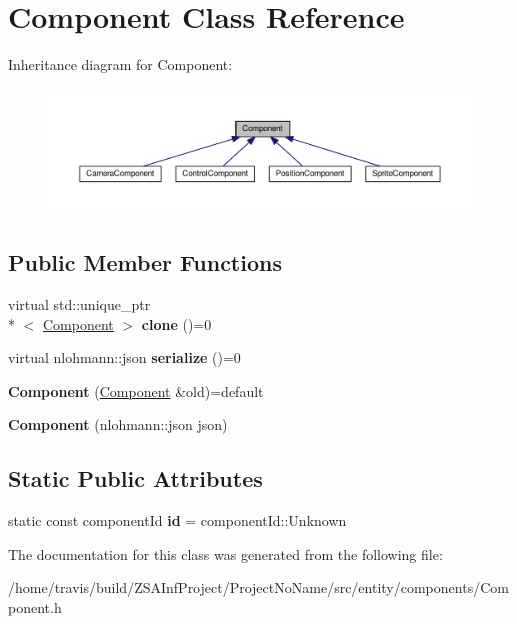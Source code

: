 \hypertarget{classComponent}{\section{Component Class Reference}
\label{classComponent}
}


Inheritance diagram for Component\-:
\nopagebreak
\begin{figure}[H]
\begin{center}
\leavevmode
\includegraphics[width=350pt]{classComponent__inherit__graph}
\end{center}
\end{figure}
\subsection*{Public Member Functions}
\begin{DoxyCompactItemize}
\item 
\hypertarget{classComponent_ab2be3d9a939ca73fa91d466be943fe69}{virtual std\-::unique\-\_\-ptr\\*
$<$ \hyperlink{classComponent}{Component} $>$ {\bfseries clone} ()=0}\label{classComponent_ab2be3d9a939ca73fa91d466be943fe69}

\item 
\hypertarget{classComponent_aff82f03afac28575d466fedd59219c3a}{virtual nlohmann\-::json {\bfseries serialize} ()=0}\label{classComponent_aff82f03afac28575d466fedd59219c3a}

\item 
\hypertarget{classComponent_a61a9c995bc0584eb210cf313107204c1}{{\bfseries Component} (\hyperlink{classComponent}{Component} \&old)=default}\label{classComponent_a61a9c995bc0584eb210cf313107204c1}

\item 
\hypertarget{classComponent_a7597fcf89c237b2cf5f584733c7b20d4}{{\bfseries Component} (nlohmann\-::json json)}\label{classComponent_a7597fcf89c237b2cf5f584733c7b20d4}

\end{DoxyCompactItemize}
\subsection*{Static Public Attributes}
\begin{DoxyCompactItemize}
\item 
\hypertarget{classComponent_af71ada3794f6d5a45c2c0823bd6a5cd0}{static const component\-Id {\bfseries id} = component\-Id\-::\-Unknown}\label{classComponent_af71ada3794f6d5a45c2c0823bd6a5cd0}

\end{DoxyCompactItemize}


The documentation for this class was generated from the following file\-:\begin{DoxyCompactItemize}
\item 
/home/travis/build/\-Z\-S\-A\-Inf\-Project/\-Project\-No\-Name/src/entity/components/Component.\-h\end{DoxyCompactItemize}
